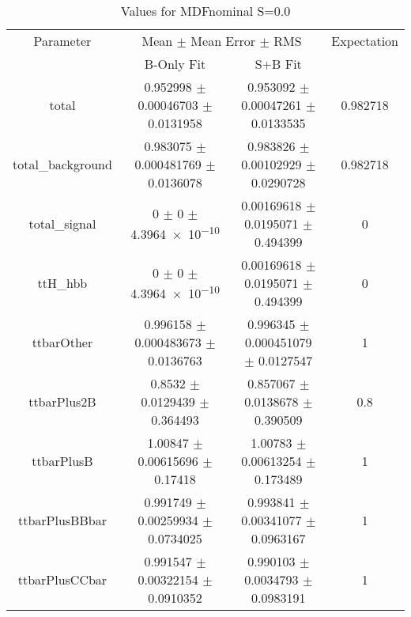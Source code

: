 \begin{table}
\centering
\caption{Values for MDFnominal S=0.0}
\begin{tabular}{cccc}
\toprule
Parameter & \multicolumn{2}{c}{Mean $\pm$ Mean Error $\pm$ RMS} & Expectation\\
 & B-Only Fit & S+B Fit & \\
\midrule
total & \num{0.952998} $\pm$ \num{0.00046703} $\pm$ \num{0.0131958} & \num{0.953092} $\pm$ \num{0.00047261} $\pm$ \num{0.0133535} & \num{0.982718}\\
total\_background & \num{0.983075} $\pm$ \num{0.000481769} $\pm$ \num{0.0136078} & \num{0.983826} $\pm$ \num{0.00102929} $\pm$ \num{0.0290728} & \num{0.982718}\\
total\_signal & \num{0} $\pm$ \num{0} $\pm$ \num{4.3964e-10} & \num{0.00169618} $\pm$ \num{0.0195071} $\pm$ \num{0.494399} & \num{0}\\
ttH\_hbb & \num{0} $\pm$ \num{0} $\pm$ \num{4.3964e-10} & \num{0.00169618} $\pm$ \num{0.0195071} $\pm$ \num{0.494399} & \num{0}\\
ttbarOther & \num{0.996158} $\pm$ \num{0.000483673} $\pm$ \num{0.0136763} & \num{0.996345} $\pm$ \num{0.000451079} $\pm$ \num{0.0127547} & \num{1}\\
ttbarPlus2B & \num{0.8532} $\pm$ \num{0.0129439} $\pm$ \num{0.364493} & \num{0.857067} $\pm$ \num{0.0138678} $\pm$ \num{0.390509} & \num{0.8}\\
ttbarPlusB & \num{1.00847} $\pm$ \num{0.00615696} $\pm$ \num{0.17418} & \num{1.00783} $\pm$ \num{0.00613254} $\pm$ \num{0.173489} & \num{1}\\
ttbarPlusBBbar & \num{0.991749} $\pm$ \num{0.00259934} $\pm$ \num{0.0734025} & \num{0.993841} $\pm$ \num{0.00341077} $\pm$ \num{0.0963167} & \num{1}\\
ttbarPlusCCbar & \num{0.991547} $\pm$ \num{0.00322154} $\pm$ \num{0.0910352} & \num{0.990103} $\pm$ \num{0.0034793} $\pm$ \num{0.0983191} & \num{1}\\
\bottomrule
\end{tabular}
\end{table}